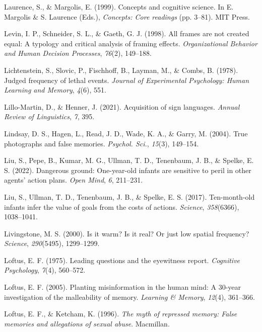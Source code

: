 \documentclass[
]{krantz}
\newlength{\cslhangindent}
\newenvironment{CSLReferences}[2] %
 {\begin{list}{}{%
  \setlength{\itemindent}{0pt}
  \setlength{\leftmargin}{0pt}
  \setlength{\parsep}{0pt}
  \ifodd #1
   \setlength{\leftmargin}{\cslhangindent}
   \setlength{\itemindent}{-1\cslhangindent}
  \fi
  \setlength{\itemsep}{#2\baselineskip}}}
 {\end{list}}
\begin{document}
\begin{CSLReferences}{1}{0}
Laurence, S., \& Margolis, E. (1999). Concepts and cognitive science. In E. Margolis \& S. Laurence (Eds.), \emph{Concepts: Core readings} (pp. 3--81). MIT Press.

Levin, I. P., Schneider, S. L., \& Gaeth, G. J. (1998). All frames are not created equal: A typology and critical analysis of framing effects. \emph{Organizational Behavior and Human Decision Processes}, \emph{76}(2), 149--188.

Lichtenstein, S., Slovic, P., Fischhoff, B., Layman, M., \& Combs, B. (1978). Judged frequency of lethal events. \emph{Journal of Experimental Psychology: Human Learning and Memory}, \emph{4}(6), 551.

Lillo-Martin, D., \& Henner, J. (2021). Acquisition of sign languages. \emph{Annual Review of Linguistics}, \emph{7}, 395.

Lindsay, D. S., Hagen, L., Read, J. D., Wade, K. A., \& Garry, M. (2004). True photographs and false memories. \emph{Psychol. Sci.}, \emph{15}(3), 149--154.

Liu, S., Pepe, B., Kumar, M. G., Ullman, T. D., Tenenbaum, J. B., \& Spelke, E. S. (2022). Dangerous ground: One-year-old infants are sensitive to peril in other agents' action plans. \emph{Open Mind}, \emph{6}, 211--231.

Liu, S., Ullman, T. D., Tenenbaum, J. B., \& Spelke, E. S. (2017). Ten-month-old infants infer the value of goals from the costs of actions. \emph{Science}, \emph{358}(6366), 1038--1041.

Livingstone, M. S. (2000). Is it warm? Is it real? Or just low spatial frequency? \emph{Science}, \emph{290}(5495), 1299--1299.

Loftus, E. F. (1975). Leading questions and the eyewitness report. \emph{Cognitive Psychology}, \emph{7}(4), 560--572.

Loftus, E. F. (2005). Planting misinformation in the human mind: A 30-year investigation of the malleability of memory. \emph{Learning \& Memory}, \emph{12}(4), 361--366.

Loftus, E. F., \& Ketcham, K. (1996). \emph{The myth of repressed memory: False memories and allegations of sexual abuse}. Macmillan.


\end{CSLReferences}
\end{document}
